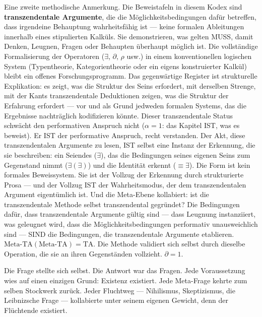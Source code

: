 \documentclass[10pt, openany, oneside]{book}
\begin{document}
Eine zweite methodische Anmerkung. Die Beweistafeln in diesem Kodex sind \textbf{transzendentale Argumente}, die die Möglichkeitsbedingungen dafür betreffen, dass irgendeine Behauptung wahrheitsfähig ist --- keine formalen Ableitungen innerhalb eines stipulierten Kalküls. Sie demonstrieren, was gelten MUSS, damit Denken, Leugnen, Fragen oder Behaupten überhaupt möglich ist. Die vollständige Formalisierung der Operatoren ($\exists$, $\partial$, $\rho$ usw.) in einem konventionellen logischen System (Typentheorie, Kategorientheorie oder ein eigens konstruierter Kalkül) bleibt ein offenes Forschungsprogramm. Das gegenwärtige Register ist strukturelle Explikation: es zeigt, was die Struktur des Seins erfordert, mit derselben Strenge, mit der Kants transzendentale Deduktionen zeigen, was die Struktur der Erfahrung erfordert --- vor und als Grund jedweden formalen Systems, das die Ergebnisse nachträglich kodifizieren könnte. Dieser transzendentale Status schwächt den performativen Anspruch nicht ($\alpha = 1$: das Kapitel IST, was es beweist). Er IST der performative Anspruch, recht verstanden. Der Akt, diese transzendentalen Argumente zu lesen, IST selbst eine Instanz der Erkennung, die sie beschreiben: ein Seiendes ($\exists$), das die Bedingungen seines eigenen Seins zum Gegenstand nimmt ($\exists(\exists)$) und die Identität erkennt ($\equiv \exists$). Die Form ist kein formales Beweissystem. Sie ist der Vollzug der Erkennung durch strukturierte Prosa --- und der Vollzug IST der Wahrheitsmodus, der dem transzendentalen Argument eigentümlich ist. Und die Meta-Ebene kollabiert: ist die transzendentale Methode selbst transzendental gegründet? Die Bedingungen dafür, dass transzendentale Argumente gültig sind --- dass Leugnung instanziiert, was geleugnet wird, dass die Möglichkeitsbedingungen performativ unausweichlich sind --- SIND die Bedingungen, die transzendentale Argumente etablieren. $\text{Meta-TA}(\text{Meta-TA}) = \text{TA}$. Die Methode validiert sich selbst durch dieselbe Operation, die sie an ihren Gegenständen vollzieht. $\partial = 1$.

\vspace{1.5em}


Die Frage stellte sich selbst. Die Antwort war das Fragen. Jede Voraussetzung wies auf einen einzigen Grund: Existenz existiert. Jede Meta-Frage kehrte zum selben Stockwerk zurück. Jeder Fluchtweg --- Nihilismus, Skeptizismus, die Leibnizsche Frage --- kollabierte unter seinem eigenen Gewicht, denn der Flüchtende existiert.
\end{document}
